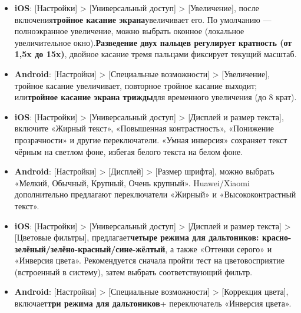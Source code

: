 

\begin{itemize}
  \item \textbf{iOS}: [Настройки] > [Универсальный доступ] > [Увеличение], после включения\textbf{тройное касание экрана}увеличивает его. По умолчанию — полноэкранное увеличение, можно выбрать оконное (локальное увеличительное окно).\textbf{Разведение двух пальцев регулирует кратность (от 1,5x до 15x)}, двойное касание тремя пальцами фиксирует текущий масштаб.
  \item \textbf{Android}: [Настройки] > [Специальные возможности] > [Увеличение], тройное касание увеличивает, повторное тройное касание выходит; или\textbf{тройное касание экрана трижды}для временного увеличения (до 8 крат).
\end{itemize}


\begin{itemize}
  \item \textbf{iOS}: [Настройки] > [Универсальный доступ] > [Дисплей и размер текста], включите «Жирный текст», «Повышенная контрастность», «Понижение прозрачности» и другие переключатели. «Умная инверсия» сохраняет текст чёрным на светлом фоне, избегая белого текста на белом фоне.
  \item \textbf{Android}: [Настройки] > [Дисплей] > [Размер шрифта], можно выбрать «Мелкий, Обычный, Крупный, Очень крупный». Huawei/Xiaomi дополнительно предлагают переключатели «Жирный» и «Высококонтрастный текст».
\end{itemize}


\begin{itemize}
  \item \textbf{iOS}: [Настройки] > [Универсальный доступ] > [Дисплей и размер текста] > [Цветовые фильтры], предлагает\textbf{четыре режима для дальтоников: красно-зелёный/зелёно-красный/сине-жёлтый}, а также «Оттенки серого» и «Инверсия цвета». Рекомендуется сначала пройти тест на цветовосприятие (встроенный в систему), затем выбрать соответствующий фильтр.
  \item \textbf{Android}: [Настройки] > [Специальные возможности] > [Коррекция цвета], включает\textbf{три режима для дальтоников}+ переключатель «Инверсия цвета».
\end{itemize}


